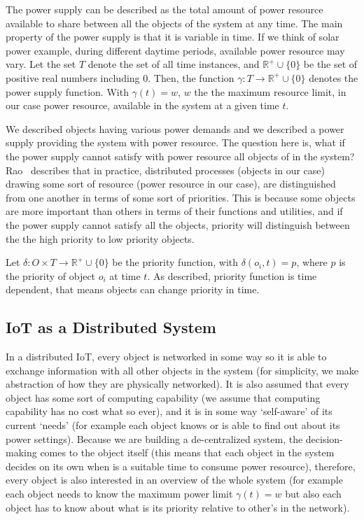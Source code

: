 \documentclass[../main/Self-Stabilization.tex]{subfiles}
\begin{document}
The power supply can be described as the total amount of power resource available to share between all the objects of the system at any time. The main property of the power supply is that it is variable in time. If we think of solar power example, during different daytime periods, available power resource may vary. Let the set $T$ denote the set of all time instances, and $\mathbb{R^+}\cup\{0\}$ be the set of positive real numbers including $0$. Then, the function $\gamma:T\rightarrow\mathbb{R^+}\cup\{0\}$ denotes the power supply function. With $\gamma(t)= w$, $w$ the \cite{rao2011foundation} the maximum resource limit, in our case power resource, available in the system at a given time $t$.

We described objects having various power demands and we described a power supply providing the system with power resource. The question here is, what if the power supply cannot satisfy with power resource all objects of in the system? Rao~\cite{rao2011foundation} describes that in practice, distributed processes (objects in our case) drawing some sort of resource (power resource in our case), are distinguished from one another in terms of some sort of priorities. This is because some objects are more important than others in terms of their functions and utilities, and if the power supply cannot satisfy all the objects, priority will distinguish between the the high priority to low priority objects.

Let $\delta:O\times T\rightarrow\mathbb{R^+}\cup\{0\}$ be the priority function, with $\delta(o_{i}, t)= p$, where $p$ is the priority of object $o_{i}$ at time $t$. As described, priority function is time dependent, that means objects can change priority in time.

\subsection{IoT as a Distributed System}

In a distributed IoT, every object is networked in some way so it is able to exchange information with all other objects in the system (for simplicity, we make abstraction of how they are physically networked). It is also assumed that every object has some sort of computing capability (we assume that computing capability has no cost what so ever), and it is in some way `self-aware' of its current `needs' (for example each object knows or is able to find out about its power settings). Because we are building a de-centralized system, the decision-making comes to the object itself (this means that each object in the system decides on its own when is a suitable time to consume power resource), therefore, every object is also interested in an overview of the whole system (for example each object needs to know the maximum power limit $\gamma(t)= w$ but also each object has to know about what is its priority relative to other's in the network).
\end{document}

